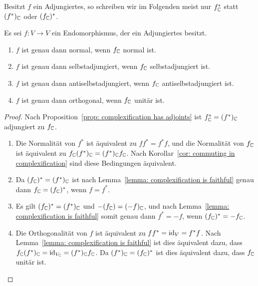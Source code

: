 \documentclass[a4paper,10pt,numbers=noenddot]{scrartcl}
\begin{document}
\begin{remark}
  Besitzt $f$ ein Adjungiertes, so schreiben wir im Folgenden meist nur $f^*_{\mathbb{C}}$ statt $(f^*)_{\mathbb{C}}$ oder $(f_{\mathbb{C}})^*$.
\end{remark}


\begin{corollary}\label{cor: complexification preserves normally stuff}
  Es sei $f \colon V \to V$ ein Endomorphismus, der ein Adjungiertes besitzt.
  \begin{enumerate}[leftmargin=*]
    \item
      $f$ ist genau dann normal, wenn $f_{\mathbb{C}}$ normal ist.
    \item
      $f$ ist genau dann selbstadjungiert, wenn $f_{\mathbb{C}}$ selbstadjungiert ist.
    \item
      $f$ ist genau dann antiselbstadjungiert, wenn $f_{\mathbb{C}}$ antiselbstadjungiert ist.
    \item
      $f$ ist genau dann orthogonal, wenn $f_{\mathbb{C}}$ unitär ist.
  \end{enumerate}
\end{corollary}


\begin{proof}
  Nach Proposition~\ref{prop: complexification has adjoints} ist $f^*_{\mathbb{C}} = (f^*)_{\mathbb{C}}$ adjungiert zu $f_{\mathbb{C}}$.
  \begin{enumerate}[leftmargin=*]
    \item
      Die Normalität von $f^*$ ist äquivalent zu $f f^* = f^* f$, und die Normalität von $f_{\mathbb{C}}$ ist äquivalent zu $f_{\mathbb{C}} (f^*)_{\mathbb{C}} = (f^*)_{\mathbb{C}} f_{\mathbb{C}}$.
      Nach Korollar~\ref{cor: commuting in complexification} sind diese Bedingungen äquivalent.
    \item
      Da $(f_{\mathbb{C}})^* = (f^*)_{\mathbb{C}}$ ist nach Lemma~\ref{lemma: complexification is faithful} genau dann $f_{\mathbb{C}} = (f_{\mathbb{C}})^*$, wenn $f = f^*$.
    \item
      Es gilt $(f_{\mathbb{C}})^* = (f^*)_{\mathbb{C}}$ und $-(f_{\mathbb{C}}) = (-f)_{\mathbb{C}}$, und nach Lemma~\ref{lemma: complexification is faithful} somit genau dann $f^* = -f$, wenn $(f_{\mathbb{C}})^* = -f_{\mathbb{C}}$.
    \item
      Die Orthogonalität von $f$ ist äquivalent zu $f f^* = \operatorname{id}_V = f^* f$.
      Nach Lemma~\ref{lemma: complexification is faithful} ist dies äquivalent dazu, dass $f_{\mathbb{C}} (f^*)_{\mathbb{C}} = \operatorname{id}_{V_{\mathbb{C}}} = (f^*)_{\mathbb{C}} f_{\mathbb{C}}$.
      Da $(f^*)_{\mathbb{C}} = (f_{\mathbb{C}})^*$ ist dies äquivalent dazu, dass $f_{\mathbb{C}}$ unitär ist.
    \qedhere
  \end{enumerate}
\end{proof}
\end{document}
